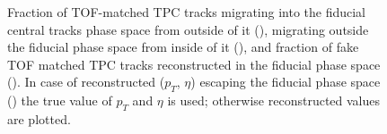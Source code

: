 \begin{figure}
{  \begin{subfigure}[b]{\linewidth}{
                }
  \end{subfigure}
}%
\caption[Fractions of migrating and fake TPC tracks matched with TOF.]{Fraction of TOF-matched TPC tracks migrating into the fiducial central tracks phase space from outside of it (), migrating outside the fiducial phase space from inside of it (), and fraction of fake TOF matched TPC tracks reconstructed in the fiducial phase space (). In case of reconstructed ($p_{T}$, $\eta$) escaping the fiducial phase space () the true value of $p_{T}$ and $\eta$ is used; otherwise reconstructed values are plotted.}
\label{fig:migrationsAndFakes_TPC}%
\end{figure}



